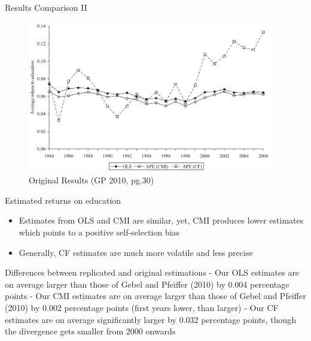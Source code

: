 \documentclass[10pt,ignorenonframetext,]{beamer}
\providecommand{\tightlist}{%
  \setlength{\itemsep}{0pt}\setlength{\parskip}{0pt}}
\begin{document}
\begin{frame}{Results Comparison II}
\protect\hypertarget{results-comparison-ii}{}

\begin{figure}
\centering
\includegraphics[width=\textwidth,height=2.60417in]{img/OLS_CMI_CF_GB2010.png}
\caption{Original Results (GP 2010, pg.30)}
\end{figure}

\end{frame}

\begin{frame}{Estimated returns on education}
\protect\hypertarget{estimated-returns-on-education}{}

\begin{itemize}
\tightlist
\item
  Estimates from OLS and CMI are similar, yet, CMI produces lower
  estimates which points to a positive self-selection bias
\item
  Generally, CF estimates are much more volatile and less precise
\end{itemize}

Differences between replicated and original estimations - Our OLS
estimates are on average larger than those of Gebel and Pfeiffer (2010)
by 0.004 percentage points - Our CMI estimates are on average larger
than those of Gebel and Pfeiffer (2010) by 0.002 percentage points
(first years lower, than larger) - Our CF estimates are on average
significantly larger by 0.032 percentage points, though the divergence
gets smaller from 2000 onwards

\end{frame}
\end{document}
